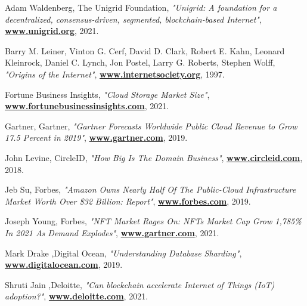 \documentclass[a4paper,oneside]{article}
\let\oldhref\href
\renewcommand{\href}[2]{\oldhref{#1}{\bfseries#2}}
\begin{document}
\newpage
\begin{thebibliography}{999}
    Adam Waldenberg, The Unigrid Foundation,
    \emph{"Unigrid: A foundation for a decentralized, consensus-driven, segmented, blockchain-based Internet"},
    \href{https://www.unigrid.org/about}{www.unigrid.org},
    2021.

    Barry M. Leiner, Vinton G. Cerf, David D. Clark, Robert E. Kahn, Leonard Kleinrock, Daniel C. Lynch, Jon Postel, Larry G. Roberts, Stephen Wolff,
    \emph{"Origins of the Internet"},
    \href{https://www.internetsociety.org/internet/history-internet/brief-history-internet}{www.internetsociety.org},
    1997.

    Fortune Business Insights,
    \emph{"Cloud Storage Market Size"},
    \href{https://www.fortunebusinessinsights.com/cloud-storage-market-102773}{www.fortunebusinessinsights.com},
    2021.

    Gartner, Gartner,
    \emph{"Gartner Forecasts Worldwide Public Cloud Revenue to Grow 17.5 Percent in 2019"},
    \href{https://www.gartner.com/en/newsroom/press-releases/2019-04-02-gartner-forecasts-worldwide-public-cloud-revenue-to-g}{www.gartner.com},
    2019.

    John Levine, CircleID,
    \emph{"How Big Is The Domain Business"},
    \href{https://www.circleid.com/posts/20180813_how_big_is_the_domain_business/}{www.circleid.com},
    2018.

    Jeb Su, Forbes,
    \emph{"Amazon Owns Nearly Half Of The Public-Cloud Infrastructure Market Worth Over \$32 Billion: Report"},
    \href{https://www.forbes.com/sites/jeanbaptiste/2019/08/02/amazon-owns-nearly-half-of-the-public-cloud-infrastructure-market-worth-over-32-billion-report/ }{www.forbes.com},
    2019.

    Joseph Young, Forbes,
    \emph{"NFT Market Rages On: NFTs Market Cap Grow 1,785\% In 2021 As Demand Explodes"},
    \href{https://www.forbes.com/sites/youngjoseph/2021/03/29/nft-market-rages-on-nfts-market-cap-grow-1785-in-2021-as-demand-explodes/
}{www.gartner.com},
    2021.

    Mark Drake ,Digital Ocean,
    \emph{"Understanding Database Sharding"},
    \href{https://www.digitalocean.com/community/tutorials/understanding-database-sharding}{www.digitalocean.com},
    2019.

    Shruti Jain ,Deloitte,
    \emph{"Can blockchain accelerate Internet of Things (IoT) adoption?"},
    \href{https://www2.deloitte.com/ch/en/pages/innovation/articles/blockchain-accelerate-iot-adoption.html}{www.deloitte.com},
    2021.


\end{thebibliography}
\end{document}
